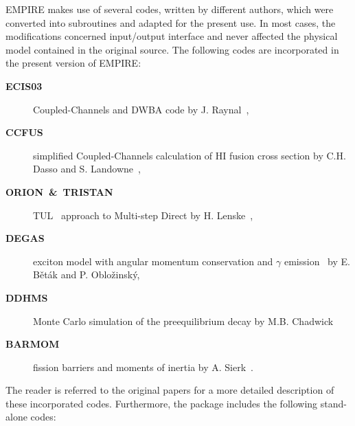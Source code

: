 \documentclass[twocolumn,amsmath,amssymb,10pt,groupedaddress,a4paper]{revtex4}
\begin{document}
EMPIRE makes use of several codes, written by different authors, which
 were converted into subroutines and adapted for the present use.
In most cases, the modifications concerned input/output interface
and never affected the physical model contained in the original source.
The following codes are incorporated in the present version of EMPIRE:
\begin{description}
\item [\textbf{ECIS03}]Coupled-Channels
and DWBA code by J. Raynal~\cite{ECIS},
\item [\textbf{CCFUS}]simplified Coupled-Channels calculation
of HI fusion cross section by C.H. Dasso and S. Landowne~\cite{CCFUS},
\item [\textbf{ORION~\&~TRISTAN}]TUL~\cite{TUL}
approach to Multi-step Direct by H. Lenske~\cite{ORTRI},
\item [\textbf{DEGAS}]exciton model with angular momentum
conservation and $\gamma$ emission~\cite{Degas} by E. B\v et\' ak
and P. Oblo\v zinsk\' y,
\item [\textbf{DDHMS}]Monte Carlo simulation of the preequilibrium
decay by M.B. Chadwick~\cite{DDHMScode}
\item [\textbf{BARMOM}]fission barriers and moments of inertia
by A. Sierk~\cite{sierk}.
\end{description}
The reader is referred to the original papers for a more detailed
description of these incorporated codes. Furthermore, the package
includes the following stand-alone codes:
\end{document}
